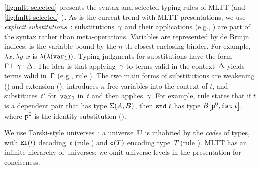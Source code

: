 





\cref{fig:mltt-selected} presents the syntax and selected typing rules of MLTT
(and \cref{fig:fmltt-selected} \TT).
%
As is the current trend with MLTT presentations, we use \emph{explicit substitutions}~\cite{substcalculus,abadi1989subst}:
substitutions~$\gamma$ and their applications (e.g., ) are part
of the syntax rather than meta-operations.
%
Variables are represented by de Bruijn indices:
 is the variable bound by the $n$-th closest enclosing binder.
For example, $\lambda x.\,\lambda y.\,x$ is $\lambda({\lambda({\texttt{var}_{1}})})$.
%
Typing judgments for substitutions have the form 
$ {\Gamma} \vdash {\ensuremath{\gamma}} : {\Delta} $.
The idea is that applying~$\gamma$ to terms valid in the context~$\Delta$
yields terms valid in~$\Gamma$ (e.g., rule ).
%
The two main forms of substitutions are weakening () and extension ():
 introduces $n$ free variables into the context of $t$, and
 substitutes~$t'$ for~$\texttt{var}_{0}$ in~$t$ and
then applies~$\gamma$.
For example, rule  states that if $t$ is a dependent pair
that has type $\Sigma({A},{B})$, then $\texttt{snd}~{t}$ has type
${B}\!\left[{{\texttt{p}^{0}},{\texttt{fst}~{t}}}\right]$,
where $\texttt{p}^{0}$ is the identity substitution ().

We use Tarski-style universes~\cite{hofmann1997syntax}: a universe~$\mathbb{U}$
is inhabited by the \emph{codes} of types,
with $\texttt{El}({t})$ decoding~$t$ (rule )
and $\texttt{c}({T})$ encoding type~$T$ (rule ).
MLTT has an infinite hierarchy of universes;
we omit universe levels in the presentation for conciseness.


